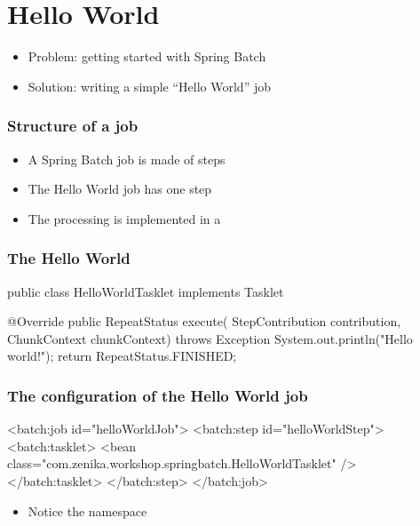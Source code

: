 \section{Hello World}

\begin{frame}
 \begin{itemize}
  \item Problem: getting started with Spring Batch
  \item Solution: writing a simple ``Hello World'' job
 \end{itemize}
\end{frame}

\begin{frame}
 \frametitle{Structure of a job}
 \begin{itemize}
  \item A Spring Batch job is made of steps
  \item The Hello World job has one step
  \item The processing is implemented in a 
 \end{itemize}
\end{frame}

\begin{frame}[fragile]
\frametitle{The Hello World }
\begin{javacode}
public class HelloWorldTasklet implements Tasklet {

  @Override
  public RepeatStatus execute(
      StepContribution contribution,
      ChunkContext chunkContext) throws Exception {
    System.out.println("Hello world!");
    return RepeatStatus.FINISHED;
  }

}
\end{javacode}
\end{frame}

\begin{frame}[fragile]
\frametitle{The configuration of the Hello World job}
\begin{xmlcode}
<batch:job id="helloWorldJob">
  <batch:step id="helloWorldStep">
    <batch:tasklet>
      <bean class="com.zenika.workshop.springbatch.HelloWorldTasklet" />
    </batch:tasklet>
  </batch:step>
</batch:job>
\end{xmlcode}

\begin{itemize}
 \item Notice the  namespace
\end{itemize}

\end{frame}

